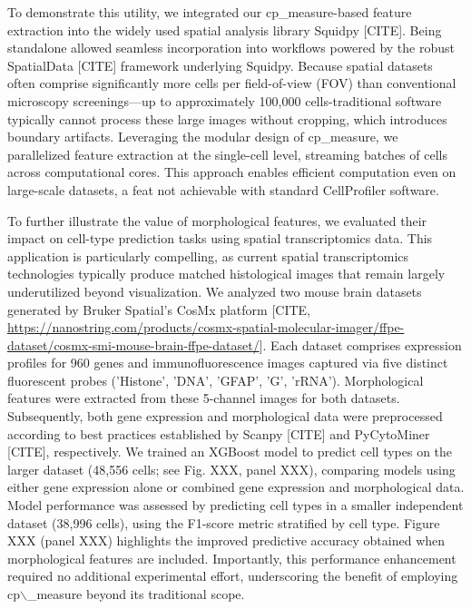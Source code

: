 \documentclass{article}
\begin{document}
To demonstrate this utility, we integrated our cp\_measure-based feature extraction into the widely used spatial analysis library Squidpy [CITE]. Being standalone allowed seamless incorporation into workflows powered by the robust SpatialData [CITE] framework underlying Squidpy. Because spatial datasets often comprise significantly more cells per field-of-view (FOV) than conventional microscopy screenings—up to approximately 100,000 cells-traditional software typically cannot process these large images without cropping, which introduces boundary artifacts. Leveraging the modular design of cp\_measure, we parallelized feature extraction at the single-cell level, streaming batches of cells across computational cores. This approach enables efficient computation even on large-scale datasets, a feat not achievable with standard CellProfiler software.

To further illustrate the value of morphological features, we evaluated their impact on cell-type prediction tasks using spatial transcriptomics data. This application is particularly compelling, as current spatial transcriptomics technologies typically produce matched histological images that remain largely underutilized beyond visualization. We analyzed two mouse brain datasets generated by Bruker Spatial's CosMx platform [CITE, \url{https://nanostring.com/products/cosmx-spatial-molecular-imager/ffpe-dataset/cosmx-smi-mouse-brain-ffpe-dataset/}]. Each dataset comprises expression profiles for 960 genes and immunofluorescence images captured via five distinct fluorescent probes ('Histone', 'DNA', 'GFAP', 'G', 'rRNA'). Morphological features were extracted from these 5-channel images for both datasets. Subsequently, both gene expression and morphological data were preprocessed according to best practices established by Scanpy [CITE] and PyCytoMiner [CITE], respectively. We trained an XGBoost model to predict cell types on the larger dataset (48,556 cells; see Fig. XXX, panel XXX), comparing models using either gene expression alone or combined gene expression and morphological data. Model performance was assessed by predicting cell types in a smaller independent dataset (38,996 cells), using the F1-score metric stratified by cell type. Figure XXX (panel XXX) highlights the improved predictive accuracy obtained when morphological features are included. Importantly, this performance enhancement required no additional experimental effort, underscoring the benefit of employing cp$\backslash$\_measure beyond its traditional scope.
\end{document}
